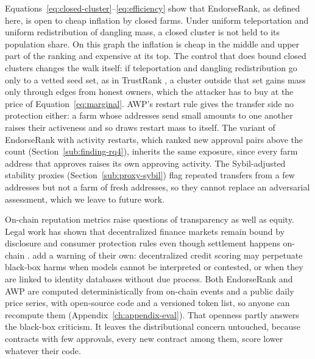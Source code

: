 Equations~\eqref{eq:closed-cluster}--\eqref{eq:efficiency} show that EndorseRank, as defined here, is open to cheap inflation by closed farms. Under uniform teleportation and uniform redistribution of dangling mass, a closed cluster is not held to its population share. On this graph the inflation is cheap in the middle and upper part of the ranking and expensive at its top. The control that does bound closed clusters changes the walk itself: if teleportation and dangling redistribution go only to a vetted seed set, as in TrustRank \parencite{gyongyi2004trustrank}, a cluster outside that set gains mass only through edges from honest owners, which the attacker has to buy at the price of Equation~\eqref{eq:marginal}. AWP's restart rule gives the transfer side no protection either: a farm whose addresses send small amounts to one another raises their activeness and so draws restart mass to itself. The variant of EndorseRank with activity restarts, which ranked new approval pairs above the count (Section~\ref{sub:finding-rq4}), inherits the same exposure, since every farm address that approves raises its own approving activity. The Sybil-adjusted stability proxies (Section~\ref{sub:proxy-sybil}) flag repeated transfers from a few addresses but not a farm of fresh addresses, so they cannot replace an adversarial assessment, which we leave to future work.


On-chain reputation metrics raise questions of transparency as well as equity. Legal work has shown that decentralized finance markets remain bound by disclosure and consumer protection rules even though settlement happens on-chain \parencite{zetzsche2020defi}. \textcite{packin2024credit} add a warning of their own: decentralized credit scoring may perpetuate black-box harms when models cannot be interpreted or contested, or when they are linked to identity databases without due process. Both EndorseRank and AWP are computed deterministically from on-chain events and a public daily price series, with open-source code and a versioned token list, so anyone can recompute them (Appendix~\ref{ch:appendix-eval}). That openness partly answers the black-box criticism. It leaves the distributional concern untouched, because contracts with few approvals, every new contract among them, score lower whatever their code.

